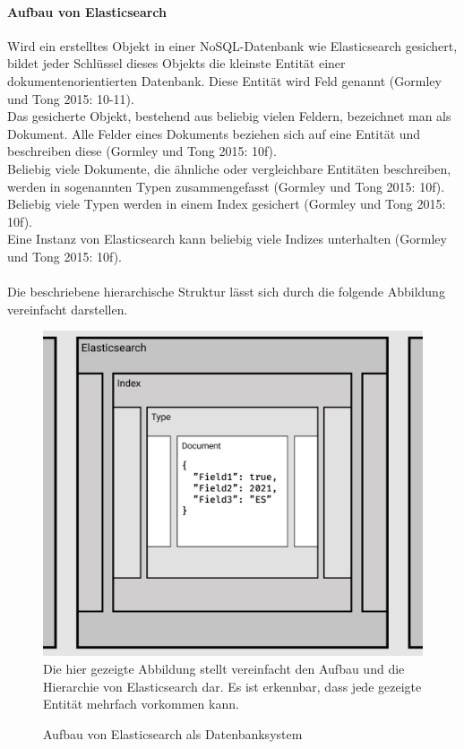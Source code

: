 \documentclass[a4paper]{scrartcl}
\begin{document}
\paragraph{Aufbau von Elasticsearch}
Wird ein erstelltes Objekt in einer NoSQL-Datenbank wie Elasticsearch gesichert, bildet jeder Schlüssel dieses Objekts die kleinste Entität einer dokumentenorientierten Datenbank. Diese Entität wird Feld genannt (Gormley und Tong 2015: 10-11). \\

Das gesicherte Objekt, bestehend aus beliebig vielen Feldern, bezeichnet man als Dokument. Alle Felder eines Dokuments beziehen sich auf eine Entität und beschreiben diese (Gormley und Tong 2015: 10f). \\

Beliebig viele Dokumente, die ähnliche oder vergleichbare Entitäten beschreiben, werden in sogenannten Typen zusammengefasst (Gormley und Tong 2015: 10f). \\

Beliebig viele Typen werden in einem Index gesichert (Gormley und Tong 2015: 10f). \\

Eine Instanz von Elasticsearch kann beliebig viele Indizes unterhalten (Gormley und Tong 2015: 10f). \\ \\
Die beschriebene hierarchische Struktur lässt sich durch die folgende Abbildung vereinfacht darstellen.

\begin{figure}[h!]
	\centering
	\caption{Aufbau von Elasticsearch als Datenbanksystem}
	\includegraphics[scale=0.2]{assets/Elasticsearch_Structure} \\
	Die hier gezeigte Abbildung stellt vereinfacht den Aufbau und die Hierarchie von Elasticsearch dar. Es ist erkennbar, dass jede gezeigte Entität mehrfach vorkommen kann.
\end{figure}
   
\end{document}
